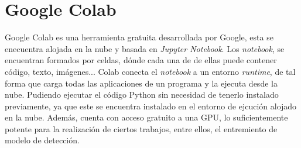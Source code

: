 \section{Google Colab} \label{colab}
Google Colab \cite{colab} es una herramienta gratuita desarrollada por Google, esta se enecuentra alojada en la nube y basada en \textit{Jupyter Notebook}.
Los \textit{notebook}, se encuentran formados por celdas, dónde cada una de de ellas puede contener código, texto, imágenes... Colab conecta el \textit{notebook} a un entorno \textit{runtime}, de tal forma que carga todas las aplicaciones de un programa y la ejecuta desde la nube. Pudiendo ejecutar el código Python sin necesidad de tenerlo instalado previamente, ya que este se encuentra instalado en el entorno de ejcución alojado en la nube.
Además, cuenta con acceso gratuito a una GPU, lo suficientemente potente para la realización de ciertos trabajos, entre ellos, el entremiento de modelo de detección.